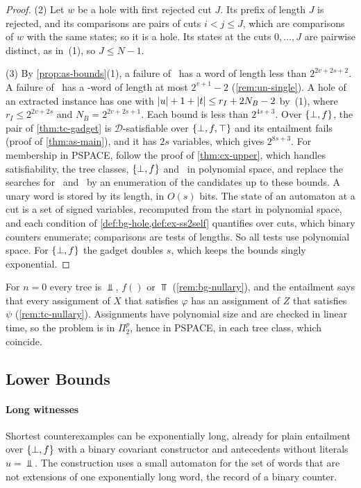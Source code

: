 \begin{proof}
(2) Let $w$ be a hole with first rejected cut $J$. Its prefix of length $J$ is
rejected, and its comparisons are pairs of cuts $i<j\le J$, which are
comparisons of $w$ with the same states; so it is a hole. Its states at the cuts
$0,\ldots,J$ are pairwise distinct, as in~(1), so $J\le N-1$.

(3) By \cref{prop:as-bounds}(1), a failure of \CondI\ has a word of
length less than $2^{2v+2s+2}$. A failure of \CondU\ has a \CondU-word of
length at most $2^{v+1}-2$ (\cref{rem:un-single}). A hole of an extracted
instance has one with $\lvert u\rvert+1+\lvert t\rvert\le r_I+2N_B-2$ by~(1), where $r_I\le2^{2v+2s}$ and
$N_B=2^{2v+2s+1}$. Each bound is less than $2^{4s+3}$.
Over $\{\bot,f\}$, the pair of \cref{thm:tc-gadget} is $\mathcal D$-satisfiable over
$\{\bot,f,\top\}$ and its entailment fails (proof of \cref{thm:as-main}), and it has $2s$
variables, which gives $2^{8s+3}$.
For membership in PSPACE, follow the proof of \cref{thm:cx-upper}, which handles
satisfiability, the tree classes, $\{\bot,f\}$ and \CondI\ in polynomial space, and
replace the searches for \CondU\ and \CondII\ by an enumeration of the
candidates up to these bounds. A unary word is stored by its length, in $O(s)$
bits. The state of an automaton at a cut is a set of signed variables,
recomputed from the start in polynomial space, and each condition of
\cref{def:bg-hole,def:ex-ss2self} quantifies over cuts, which binary counters
enumerate; comparisons are tests of lengths. So all tests use polynomial space.
For $\{\bot,f\}$ the gadget doubles $s$, which keeps the bounds singly exponential.
\end{proof}

\begin{remark}\label{rem:cx-nullary}
For $n=0$ every tree is $\Bot$, $f()$ or $\Top$ (\cref{rem:bg-nullary}), and the
entailment says that every assignment of $X$ that satisfies $\varphi$ has an
assignment of $Z$ that satisfies $\psi$ (\cref{rem:tc-nullary}). Assignments
have polynomial size and are checked in linear time, so the problem is in
$\Pi^p_2$, hence in PSPACE, in each tree class, which coincide.
\end{remark}

\subsection{Lower Bounds}\label{sec:cx-lower}

\paragraph{Long witnesses}
Shortest counterexamples can be exponentially long, already for plain
entailment over $\{\bot,f\}$ with a binary covariant constructor and antecedents
without literals $u=\Bot$. The construction uses a small automaton for the set
of words that are not extensions of one exponentially long word, the record of
a binary counter.

